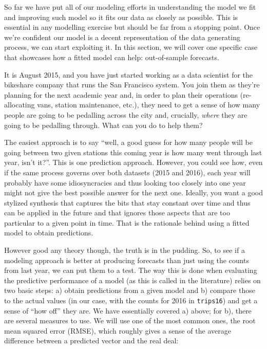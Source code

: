 \documentclass[
  letterpaper,
  DIV=11,
  numbers=noendperiod,
  oneside]{scrreprt}
\begin{document}
So far we have put all of our modeling efforts in understanding the
model we fit and improving such model so it fits our data as closely as
possible. This is essential in any modelling exercise but should be far
from a stopping point. Once we're confident our model is a decent
representation of the data generating process, we can start exploiting
it. In this section, we will cover one specific case that showcases how
a fitted model can help: out-of-sample forecasts.

It is August 2015, and you have just started working as a data scientist
for the bikeshare company that runs the San Francisco system. You join
them as they're planning for the next academic year and, in order to
plan their operations (re-allocating vans, station maintenance, etc.),
they need to get a sense of how many people are going to be pedalling
across the city and, crucially, \emph{where} they are going to be
pedalling through. What can you do to help them?

The easiest approach is to say ``well, a good guess for how many people
will be going between two given stations this coming year is how many
went through last year, isn't it?''. This is one prediction approach.
However, you could see how, even if the same process governs over both
datasets (2015 and 2016), each year will probably have some
idiosyncracies and thus looking too closely into one year might not give
the best possible answer for the next one. Ideally, you want a good
stylized synthesis that captures the bits that stay constant over time
and thus can be applied in the future and that ignores those aspects
that are too particular to a given point in time. That is the rationale
behind using a fitted model to obtain predictions.

However good any theory though, the truth is in the pudding. So, to see
if a modeling approach is better at producing forecasts than just using
the counts from last year, we can put them to a test. The way this is
done when evaluating the predictive performance of a model (as this is
called in the literature) relies on two basic steps: a) obtain
predictions from a given model and b) compare those to the actual values
(in our case, with the counts for 2016 in \texttt{trips16}) and get a
sense of ``how off'' they are. We have essentially covered a) above; for
b), there are several measures to use. We will use one of the most
common ones, the root mean squared error (RMSE), which roughly gives a
sense of the average difference between a predicted vector and the real
deal:
\end{document}
